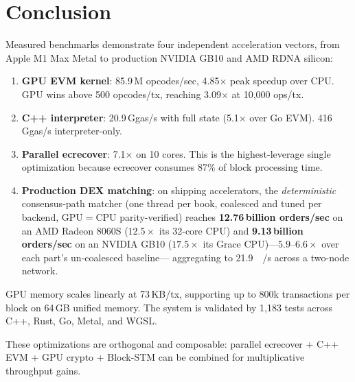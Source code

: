 \section{Conclusion}


Measured benchmarks demonstrate four independent acceleration vectors, from Apple M1 Max Metal
to production NVIDIA GB10 and AMD RDNA silicon:

\begin{enumerate}
\item \textbf{GPU EVM kernel}: 85.9\,M opcodes/sec, 4.85$\times$ peak speedup over CPU.
      GPU wins above 500 opcodes/tx, reaching 3.09$\times$ at 10{,}000 ops/tx.
\item \textbf{C++ interpreter}: 20.9\,Ggas/s with full state (5.1$\times$ over Go EVM).
      416\,Ggas/s interpreter-only.
\item \textbf{Parallel ecrecover}: 7.1$\times$ on 10 cores. This is the highest-leverage
      single optimization because ecrecover consumes 87\% of block processing time.
\item \textbf{Production DEX matching}: on shipping accelerators, the \emph{deterministic}
      consensus-path matcher (one thread per book, coalesced and tuned per backend, GPU$=$CPU
      parity-verified) reaches \textbf{12.76\,billion orders/sec} on an AMD Radeon 8060S
      ($12.5\times$ its 32-core CPU) and \textbf{9.13\,billion orders/sec} on an NVIDIA GB10
      ($17.5\times$ its Grace CPU)---$5.9$--$6.6\times$ over each part's un-coalesced baseline---
      aggregating to \SI{21.9}{\giga{}/\second} across a two-node network.
\end{enumerate}

GPU memory scales linearly at 73\,KB/tx, supporting up to 800k transactions per block
on 64\,GB unified memory. The system is validated by 1{,}183 tests across C++, Rust, Go,
Metal, and WGSL.

These optimizations are orthogonal and composable: parallel ecrecover + C++ EVM +
GPU crypto + Block-STM can be combined for multiplicative throughput gains.

